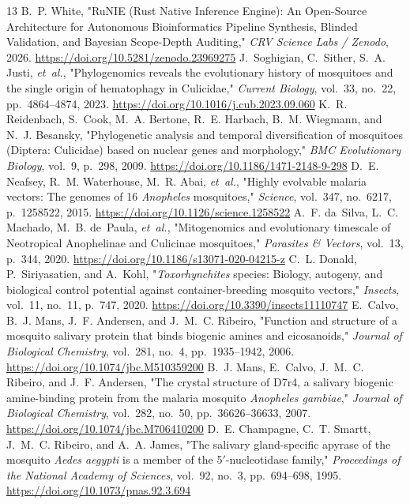 \documentclass[10pt,letterpaper]{article}
\begin{document}
\begin{thebibliography}{13}
 B.~P. White, "RuNIE (Rust Native Inference Engine): An Open-Source Architecture for Autonomous Bioinformatics Pipeline Synthesis, Blinded Validation, and Bayesian Scope-Depth Auditing," \emph{CRV Science Labs / Zenodo}, 2026. \url{https://doi.org/10.5281/zenodo.23969275}
 J.~Soghigian, C.~Sither, S.~A. Justi, \emph{et~al.}, "Phylogenomics reveals the evolutionary history of mosquitoes and the single origin of hematophagy in Culicidae," \emph{Current Biology}, vol.~33, no.~22, pp.~4864--4874, 2023. \url{https://doi.org/10.1016/j.cub.2023.09.060}
 K.~R. Reidenbach, S.~Cook, M.~A. Bertone, R.~E. Harbach, B.~M. Wiegmann, and N.~J. Besansky, "Phylogenetic analysis and temporal diversification of mosquitoes (Diptera: Culicidae) based on nuclear genes and morphology," \emph{BMC Evolutionary Biology}, vol.~9, p.~298, 2009. \url{https://doi.org/10.1186/1471-2148-9-298}
 D.~E. Neafsey, R.~M. Waterhouse, M.~R. Abai, \emph{et~al.}, "Highly evolvable malaria vectors: The genomes of 16 \emph{Anopheles} mosquitoes," \emph{Science}, vol.~347, no.~6217, p.~1258522, 2015. \url{https://doi.org/10.1126/science.1258522}
 A.~F. da~Silva, L.~C. Machado, M.~B. de~Paula, \emph{et~al.}, "Mitogenomics and evolutionary timescale of Neotropical Anophelinae and Culicinae mosquitoes," \emph{Parasites \& Vectors}, vol.~13, p.~344, 2020. \url{https://doi.org/10.1186/s13071-020-04215-z}
 C.~L. Donald, P.~Siriyasatien, and A.~Kohl, "\emph{Toxorhynchites} species: Biology, autogeny, and biological control potential against container-breeding mosquito vectors," \emph{Insects}, vol.~11, no.~11, p.~747, 2020. \url{https://doi.org/10.3390/insects11110747}
 E.~Calvo, B.~J. Mans, J.~F. Andersen, and J.~M.~C. Ribeiro, "Function and structure of a mosquito salivary protein that binds biogenic amines and eicosanoids," \emph{Journal of Biological Chemistry}, vol.~281, no.~4, pp.~1935--1942, 2006. \url{https://doi.org/10.1074/jbc.M510359200}
 B.~J. Mans, E.~Calvo, J.~M.~C. Ribeiro, and J.~F. Andersen, "The crystal structure of D7r4, a salivary biogenic amine-binding protein from the malaria mosquito \emph{Anopheles gambiae}," \emph{Journal of Biological Chemistry}, vol.~282, no.~50, pp.~36626--36633, 2007. \url{https://doi.org/10.1074/jbc.M706410200}
 D.~E. Champagne, C.~T. Smartt, J.~M.~C. Ribeiro, and A.~A. James, "The salivary gland-specific apyrase of the mosquito \emph{Aedes aegypti} is a member of the 5$'$-nucleotidase family," \emph{Proceedings of the National Academy of Sciences}, vol.~92, no.~3, pp.~694--698, 1995. \url{https://doi.org/10.1073/pnas.92.3.694}

\end{thebibliography}
\end{document}
